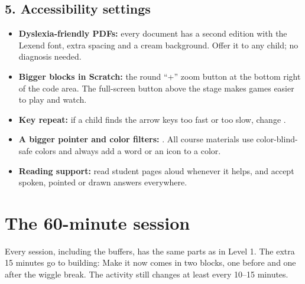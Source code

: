 \documentclass[track=junior,level=2,teacher]{kidscode}
\begin{document}
\subsection{5. Accessibility settings}
\begin{itemize}[itemsep=3pt]
  \item \textbf{Dyslexia-friendly PDFs:} every document has a second edition with the Lexend font,
        extra spacing and a cream background. Offer it to any child; no diagnosis needed.
  \item \textbf{Bigger blocks in Scratch:} the round \enquote{+} zoom button at the bottom right of
        the code area. The full-screen button above the stage makes games easier to play and watch.
  \item \textbf{Key repeat:} if a child finds the arrow keys too fast or too slow, change
        .
  \item \textbf{A bigger pointer and color filters:} .
        All course materials use color-blind-safe colors and always add a word or an icon to a color.
  \item \textbf{Reading support:} read student pages aloud whenever it helps, and accept spoken,
        pointed or drawn answers everywhere.
\end{itemize}

\section{The 60-minute session}
Every session, including the buffers, has the same parts as in Level 1. The extra 15 minutes go
to building: Make it now comes in two blocks, one before and one after the wiggle break. The
activity still changes at least every 10--15 minutes.

\begin{timeplan}
\end{timeplan}
\end{document}
